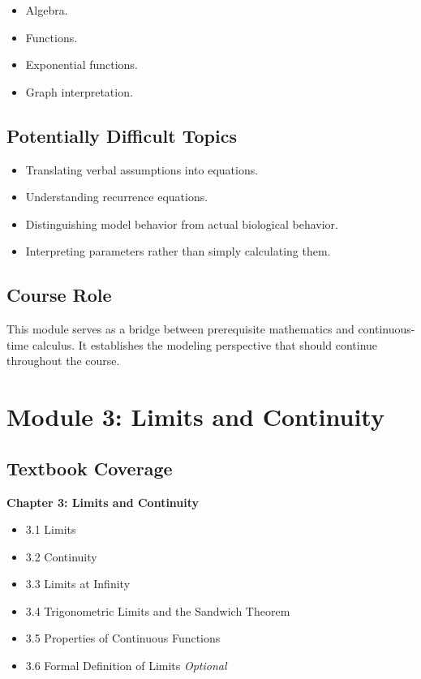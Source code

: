 \documentclass[11pt]{article}
\newcommand{\optional}{\textit{Optional}}
\begin{document}
\begin{itemize}
    \item Algebra.
    \item Functions.
    \item Exponential functions.
    \item Graph interpretation.
\end{itemize}

\subsection{Potentially Difficult Topics}

\begin{itemize}
    \item Translating verbal assumptions into equations.
    \item Understanding recurrence equations.
    \item Distinguishing model behavior from actual biological behavior.
    \item Interpreting parameters rather than simply calculating them.
\end{itemize}

\subsection{Course Role}

This module serves as a bridge between prerequisite mathematics and
continuous-time calculus. It establishes the modeling perspective that should
continue throughout the course.

\section{Module 3: Limits and Continuity}

\subsection{Textbook Coverage}

\textbf{Chapter 3: Limits and Continuity}

\begin{itemize}
    \item 3.1 Limits
    \item 3.2 Continuity
    \item 3.3 Limits at Infinity
    \item 3.4 Trigonometric Limits and the Sandwich Theorem
    \item 3.5 Properties of Continuous Functions
    \item 3.6 Formal Definition of Limits \optional
\end{itemize}
\end{document}
